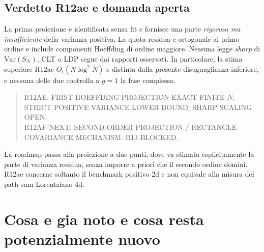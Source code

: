 \documentclass[11pt,a4paper]{article}
\newcommand{\status}[1]{\textsf{#1}}
\begin{document}
\subsection{Verdetto R12ae e domanda aperta}

La prima proiezione e identificata senza fit e fornisce una parte \emph{rigorosa ma insufficiente} della varianza positiva. La quota residua e ortogonale al primo ordine e include componenti Hoeffding di ordine maggiore. Nessuna legge \emph{sharp} di $\mathrm{Var}(S_N)$, CLT o LDP segue dai rapporti osservati. In particolare, la stima superiore R12ac $O_\epsilon(N\log^2N)$ e distinta dalla presente disuguaglianza inferiore, e nessuna delle due controlla a $g=1$ la fase complessa.

\begin{quote}\small
\status{R12AE: FIRST HOEFFDING PROJECTION EXACT FINITE-$N$; STRICT POSITIVE VARIANCE LOWER BOUND; SHARP SCALING OPEN.}\\
\status{R12AF NEXT: SECOND-ORDER PROJECTION / RECTANGLE-COVARIANCE MECHANISM. R13 BLOCKED.}
\end{quote}

La roadmap passa alla proiezione a due punti, dove va stimata esplicitamente la parte di varianza residua, senza imporre a priori che il secondo ordine domini. R12ae concerne soltanto il benchmark positivo 2d e non equivale alla misura del path sum Lorentziano 4d.

\clearpage
\section{Cosa e gia noto e cosa resta potenzialmente nuovo}
\end{document}
